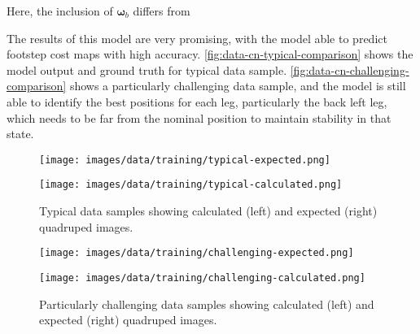 Here, the inclusion of $\mathbf \omega_b$ differs from
\cite{bratta_contactnet_2024}

The results of this model are very promising, with the model able to
predict footstep cost maps with high accuracy.
\autoref{fig:data-cn-typical-comparison}
shows the model output and ground truth for typical data sample.
\autoref{fig:data-cn-challenging-comparison}
shows a particularly challenging data sample, and the model is still
able to identify the best positions for each leg,
particularly the back left leg, which needs to be far from the
nominal position to maintain stability in that state.

\begin{figure}
  \centering
  \begin{minipage}[T]{0.45\textwidth}
    \centering
    \texttt{[image: images/data/training/typical-expected.png]}
  \end{minipage}
  \hfill
  \begin{minipage}[T]{0.45\textwidth}
    \centering
    \texttt{[image: images/data/training/typical-calculated.png]}
  \end{minipage}
  \hfill

  \caption{Typical data samples showing calculated (left) and
  expected (right) quadruped images.}
  \label{fig:data-cn-typical-comparison}
\end{figure}

\begin{figure}
  \centering
  \begin{minipage}[T]{0.45\textwidth}
    \centering
    \texttt{[image: images/data/training/challenging-expected.png]}
  \end{minipage}
  \hfill
  \begin{minipage}[T]{0.45\textwidth}
    \centering
    \texttt{[image: images/data/training/challenging-calculated.png]}
  \end{minipage}
  \hfill

  \caption{Particularly challenging data samples showing calculated (left) and
  expected (right) quadruped images.}
  \label{fig:data-cn-challenging-comparison}
\end{figure}
